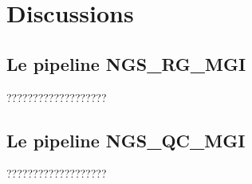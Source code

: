\section{Discussions}
\subsection{Le pipeline NGS\_RG\_MGI}
???????????????????

\subsection{Le pipeline NGS\_QC\_MGI}
???????????????????